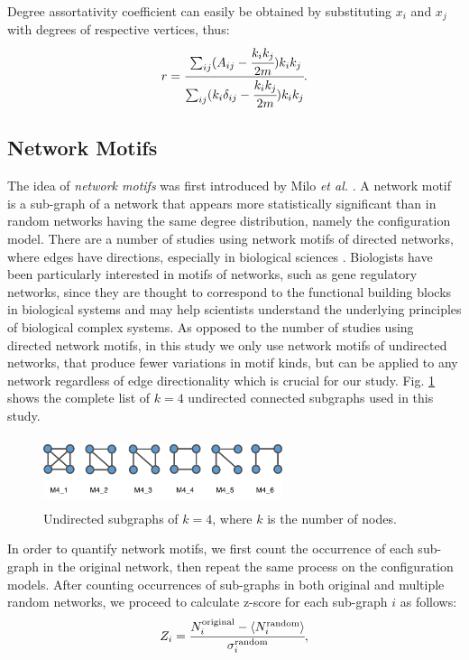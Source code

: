 Degree assortativity coefficient can easily be obtained by substituting $x_i$ and $x_j$ with degrees of respective vertices, thus:
	\begin{equation}
	 r =  \cfrac{\sum_{ij}(A_{ij} - \cfrac{k_i k_j}{2m})k_i k_j}{\sum_{ij}(k_i \delta_{ij} - \cfrac{k_i k_j}{2m}) k_i k_j}.
	\end{equation}

	\subsection{Network Motifs} 
The idea of \textit{network motifs} was first introduced by Milo \textit{et al.} \cite{Milo_motif}. A network motif is a sub-graph of a network that appears more statistically significant than in random networks having the same degree distribution, namely the configuration model. There are a number of studies using network motifs of directed networks, where edges have directions, especially in biological sciences \cite{Alon2007, MotifsInBrain, NetworkMotifsEcoli}. Biologists have been particularly interested in motifs of networks, such as gene regulatory networks, since they are thought to correspond to the functional building blocks in biological systems and may help scientists understand the underlying principles of biological complex systems.
As opposed to the number of studies using directed network motifs, in this study we only use network motifs of undirected networks, that produce fewer variations in motif kinds, but can be applied to any network regardless of edge directionality which is crucial for our study. Fig. \ref{motifs} shows the complete list of $k=4$ undirected connected subgraphs used in this study.

\begin{figure}[ht]
	\begin{center}
		\vspace{0.5cm}
		\includegraphics[clip,width=7cm,height = 2cm]{figs/motifs.png}
		\vspace{0.5cm}
		\caption{Undirected subgraphs of $k =4$, where $k$ is the number of nodes.}
		\label{motifs}
	\end{center}
\end{figure}

In order to quantify network motifs, we first count the occurrence of each sub-graph in the original network, then repeat the same process on the configuration models. After counting occurrences of sub-graphs in both original and multiple random networks, we proceed to calculate z-score for each sub-graph $i$ as follows:
	\begin{equation}
	Z_i = \cfrac{N_i^{\text{original}} - \langle N_i^{\text{random}} \rangle }{\sigma_i^{\text{random}}},
	\end{equation}

